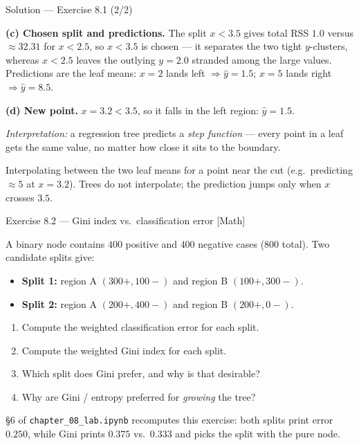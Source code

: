 \documentclass[aspectratio=169,11pt]{beamer}
\begin{document}
\begin{frame}{Solution --- Exercise 8.1 (2/2)}
\begin{solutionbox}
\textbf{(c) Chosen split and predictions.} The split $x<3.5$ gives total RSS $1.0$ versus $\approx32.31$ for $x<2.5$, so $x<3.5$ is chosen --- it separates the two tight $y$-clusters, whereas $x<2.5$ leaves the outlying $y=2.0$ stranded among the large values. Predictions are the leaf means: $x=2$ lands left $\Rightarrow \hat y=1.5$; $x=5$ lands right $\Rightarrow \hat y=8.5$.

\medskip
\textbf{(d) New point.} $x=3.2<3.5$, so it falls in the left region: $\hat y=1.5$.

\medskip
\emph{Interpretation:} a regression tree predicts a \emph{step function} --- every point in a leaf gets the same value, no matter how close it sits to the boundary.
\end{solutionbox}
\begin{mistake}
Interpolating between the two leaf means for a point near the cut (e.g.\ predicting $\approx5$ at $x=3.2$). Trees do not interpolate; the prediction jumps only when $x$ crosses $3.5$.
\end{mistake}
\end{frame}

\begin{frame}{Exercise 8.2 --- Gini index vs.\ classification error [Math]}
\begin{exercise}
A binary node contains $400$ positive and $400$ negative cases ($800$ total). Two candidate splits give:
\begin{itemize}
  \item \textbf{Split 1:} region A $(300+,100-)$ and region B $(100+,300-)$.
  \item \textbf{Split 2:} region A $(200+,400-)$ and region B $(200+,0-)$.
\end{itemize}
\begin{enumerate}
  \item Compute the weighted classification error for each split.
  \item Compute the weighted Gini index for each split.
  \item Which split does Gini prefer, and why is that desirable?
  \item Why are Gini / entropy preferred for \emph{growing} the tree?
\end{enumerate}
\end{exercise}
\begin{labnote}
\S6 of \texttt{chapter\_08\_lab.ipynb} recomputes this exercise: both splits print error $0.250$, while Gini prints $0.375$ vs.\ $0.333$ and picks the split with the pure node.
\end{labnote}
\end{frame}
\end{document}

